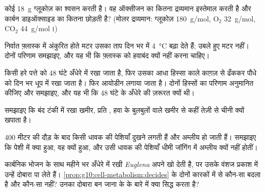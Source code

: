 \begin{exercise}[$\star\star$]\label{exo:g10:cell-metabolism:8}
कोई  \qty{18}{g} ग्लूकोज़ का श्वसन करती है। वह ऑक्सीजन का कितना
द्रव्यमान इस्तेमाल करती है और कार्बन डाइऑक्साइड का कितना छोड़ती है?
(मोलर द्रव्यमान: ग्लूकोज़ \qty{180}{g/mol}, $\mathrm{O_2}$
\qty{32}{g/mol}, $\mathrm{CO_2}$ \qty{44}{g/mol}।)
\end{exercise}

\begin{exercise}[$\star\star$]\label{exo:g10:cell-metabolism:9}
निर्वात फ़्लास्क में अंकुरित होते मटर उसका ताप दिन भर में
\qty{4}{\celsius} बढ़ा देते हैं; उबले हुए मटर नहीं। दोनों परिणाम
समझाइए, और यह भी कि फ़्लास्क को हवाबंद क्यों नहीं करना चाहिए।
\end{exercise}

\begin{exercise}[$\star\star$]\label{exo:g10:cell-metabolism:10}
किसी हरे पत्ते को 48 घंटे अँधेरे में रखा जाता है, फिर उसका आधा हिस्सा
काले काग़ज़ से ढँककर पौधे को दिन भर धूप में रखा जाता है। फिर आयोडीन
लगाया जाता है। दोनों हिस्सों का परिणाम अनुमानित कीजिए और समझाइए, और यह भी
कि 48 घंटे के अँधेरे की ज़रूरत क्यों थी।
\end{exercise}

\begin{exercise}[$\star\star$]\label{exo:g10:cell-metabolism:11}
समझाइए कि बंद टंकी में रखा खमीर, प्रति , हवा के बुलबुलों वाले खमीर
से कहीं तेज़ी से चीनी क्यों खपाता है।
\end{exercise}

\begin{exercise}[$\star\star\star$]\label{exo:g10:cell-metabolism:12}
400 मीटर की दौड़ के बाद किसी धावक की पेशियाँ दुखने लगती हैं और अम्लीय हो
जाती हैं। समझाइए कि पेशी  में क्या हुआ, वह क्यों हुआ, और उसी
धावक की पेशियाँ धीमी जॉगिंग में अम्लीय क्यों नहीं होतीं।
\end{exercise}

\begin{exercise}[$\star\star\star$]\label{exo:g10:cell-metabolism:13}
कार्बनिक भोजन के साथ महीने भर अँधेरे में रखी \emph{Euglena} अपने 
खो देती है, पर उसके वंशज प्रकाश में उन्हें दोबारा पा लेते हैं।
\cref{prop:g10:cell-metabolism:decides} के दोनों कारकों में से कौन-सा
बदला है और कौन-सा नहीं? उनका दोबारा बन जाना  के  के बारे में
क्या सिद्ध करता है?
\end{exercise}

